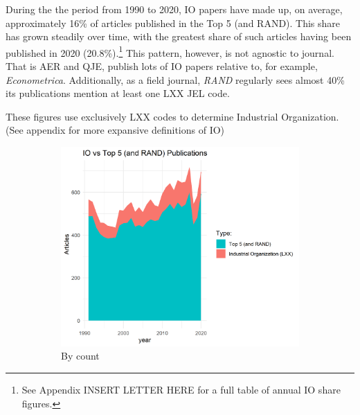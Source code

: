 \documentclass[11pt, letterpaper, twoside]{article}
\begin{document}
During the the period from 1990 to 2020, IO papers have made up, on average, approximately 16\% of articles published in the Top 5 (and RAND). This share has grown steadily over time, with the greatest share of such articles having been published in 2020 (20.8\%).\footnote{See Appendix INSERT LETTER HERE for a full table of annual IO share figures.} This pattern, however, is not agnostic to journal. That is AER and QJE, publish lots of IO papers relative to, for example, \textit{Econometrica}. Additionally, as a field journal, \textit{RAND} regularly sees almost 40\% its publications mention at least one LXX JEL code.

These figures use exclusively LXX codes to determine Industrial Organization. (See appendix for more expansive definitions of IO)

\begin{figure}[h]
    \caption{The share of Top 5 (and RAND) articles that are IO related (LXX)}
    \begin{subfigure}[h]{0.49\textwidth}
        \centering
        \includegraphics[width=\textwidth]{LXX-code-share-area.png}
        \caption{By count}
    \end{subfigure}
    \hfill
    \begin{subfigure}[h]{0.49\textwidth}
        \centering

\end{subfigure}
\end{figure}
\end{document}
